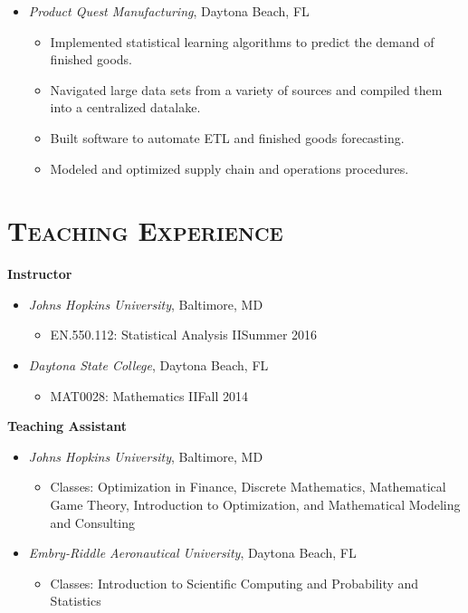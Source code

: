 \documentclass[10pt]{article}
\begin{document}
\begin{itemize}[noitemsep]
    \item[] \textit{Product Quest Manufacturing}, Daytona Beach, FL
    \begin{itemize}[noitemsep]
        \item Implemented statistical learning algorithms to predict the demand of finished goods.
        \item Navigated large data sets from a variety of sources and compiled them into a centralized datalake.
        \item Built software to automate ETL and finished goods forecasting.
        \item Modeled and optimized supply chain and operations procedures.
    \end{itemize}
\end{itemize}

\section*{\textsc{Teaching Experience}}
\textbf{Instructor}
\begin{itemize}[noitemsep]
    \item[] \textit{Johns Hopkins University}, Baltimore, MD
    \begin{itemize}[noitemsep]
        \item EN.550.112: Statistical Analysis II\hfill Summer 2016
    \end{itemize}
    \vspace{1ex}
    \item[] \textit{Daytona State College}, Daytona Beach, FL
    \begin{itemize}[noitemsep]
        \item MAT0028: Mathematics II\hfill Fall 2014
    \end{itemize}
\end{itemize}
\textbf{Teaching Assistant}
\begin{itemize}[noitemsep]
    \item[] \textit{Johns Hopkins University}, Baltimore, MD
    \begin{itemize}[noitemsep]
        \item[] Classes: Optimization in Finance, Discrete Mathematics, Mathematical Game Theory, Introduction to Optimization, and Mathematical Modeling and Consulting
    \end{itemize}
    \vspace{1ex}
    \item[] \textit{Embry-Riddle Aeronautical University}, Daytona Beach, FL
    \begin{itemize}[noitemsep]
        \item[] Classes: Introduction to Scientific Computing and Probability and Statistics
    \end{itemize}
\end{itemize}
\end{document}
